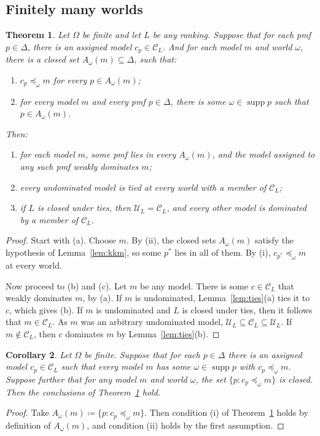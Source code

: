 \documentclass[11pt]{article}
\newtheorem{theorem}{Theorem}[section]
\newtheorem{corollary}[theorem]{Corollary}
\theoremstyle{definition}
\newcommand{\C}{\mathcal C}
\newcommand{\U}{\mathcal U}
\newcommand{\supp}{\operatorname{supp}}
\begin{document}
\subsection{Finitely many worlds}
\begin{theorem}\label{thm:finite}
Let $\Omega$ be finite and let $L$ be any ranking. Suppose that for each pmf $p\in\Delta$, there is an assigned model $c_p\in\C_L$. And for each model $m$ and world $\omega$, there is a closed set $A_\omega(m)\subseteq\Delta$, such that:
\begin{enumerate}[label=(\roman*)]
\item $c_p\preceq_\omega m$ for every $p\in A_\omega(m)$;
\item for every model $m$ and every pmf $p\in\Delta$, there is some $\omega\in\supp p$ such that $p\in A_\omega(m)$.
\end{enumerate}
Then:
\begin{enumerate}[label=(\alph*)]
\item for each model $m$, some pmf lies in every $A_\omega(m)$, and the model assigned to any such pmf weakly dominates $m$;
\item every undominated model is tied at every world with a member of $\C_L$;
\item if $L$ is closed under ties, then $\U_L=\C_L$, and every other model is dominated by a member of $\C_L$.
\end{enumerate}
\end{theorem}
\begin{proof}
Start with (a). Choose $m$. By (ii), the closed sets $A_\omega(m)$ satisfy the hypothesis of Lemma~\ref{lem:kkm}, so some $p^*$ lies in all of them. By (i), $c_{p^*}\preceq_\omega m$ at every world. 

Now proceed to (b) and (c). Let $m$ be any model. There is some $c\in\C_L$ that weakly dominates $m$, by (a). If $m$ is undominated, Lemma~\ref{lem:ties}(a) ties it to $c$, which gives (b). If $m$ is undominated and $L$ is closed under ties, then it follows that $m\in\C_L$. As $m$ was an arbitrary undominated model, $\U_L\subseteq\C_L\subseteq\U_L$. If $m\notin\C_L$, then $c$ dominates $m$ by Lemma~\ref{lem:ties}(b).
\end{proof}

\begin{corollary}\label{cor:closed-choice}
Let $\Omega$ be finite. Suppose that for each $p\in\Delta$ there is an assigned model $c_p\in\C_L$ such that every model $m$ has some $\omega\in\supp p$ with $c_p\preceq_\omega m$. Suppose further that for any model $m$ and world $\omega$, the set $\{p:c_p\preceq_\omega m\}$ is closed. Then the conclusions of Theorem~\ref{thm:finite} hold.
\end{corollary}
\begin{proof}
Take $A_\omega(m)\coloneqq\{p:c_p\preceq_\omega m\}$. Then condition (i) of Theorem~\ref{thm:finite} holds by definition of $A_\omega(m)$, and condition (ii) holds by the first assumption.
\end{proof}
\end{document}
